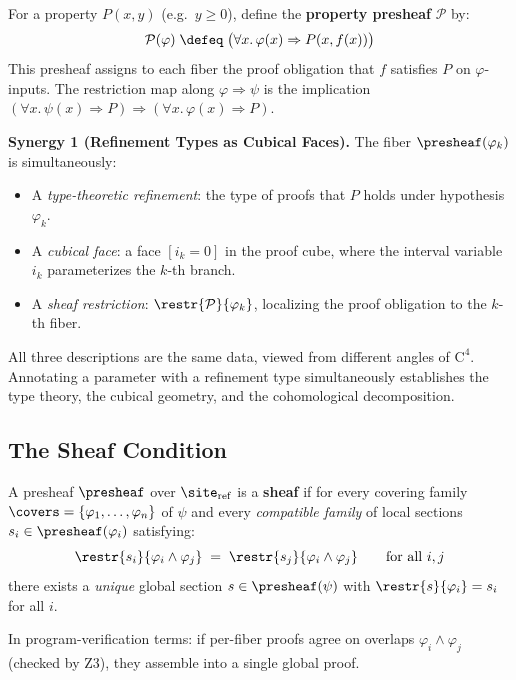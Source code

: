 \begin{example}
\label{ex:property-presheaf}
For a property $P(x, y)$ (e.g.\ $y \ge 0$), define the
\textbf{property presheaf} $\mathcal{P}$ by:
\[
  \mathcal{P}(\varphi) \;\defeq\;
  \bigl(\forall x.\,\varphi(x) \Rightarrow P(x, f(x))\bigr)
\]
This presheaf assigns to each fiber the proof obligation that $f$ satisfies
$P$ on $\varphi$-inputs.  The restriction map along $\varphi \Rightarrow
\psi$ is the implication $(\forall x.\,\psi(x) \Rightarrow P) \Rightarrow
(\forall x.\,\varphi(x) \Rightarrow P)$.

\medskip\noindent\textbf{Synergy 1 (Refinement Types as Cubical Faces).}
The fiber $\presheaf(\varphi_k)$ is simultaneously:
\begin{itemize}
\item A \emph{type-theoretic refinement}: the type of proofs that $P$
  holds under hypothesis $\varphi_k$.
\item A \emph{cubical face}: a face $[i_k = 0]$ in the proof cube, where
  the interval variable $i_k$ parameterizes the $k$-th branch.
\item A \emph{sheaf restriction}: $\restr{\mathcal{P}}{\varphi_k}$,
  localizing the proof obligation to the $k$-th fiber.
\end{itemize}
All three descriptions are the same data, viewed from different angles of
$\mathrm{C}^4$.  Annotating a parameter with a refinement type
simultaneously establishes the type theory, the cubical geometry, and the
cohomological decomposition.
\end{example}

\subsection{The Sheaf Condition}

\begin{definition}
\label{def:refinement-sheaf-condition}
A presheaf $\presheaf$ over $\site_{\mathrm{ref}}$ is a \textbf{sheaf} if
for every covering family $\covers = \{\varphi_1,\ldots,\varphi_n\}$ of
$\psi$ and every \emph{compatible family} of local sections
$s_i \in \presheaf(\varphi_i)$ satisfying:
\[
  \restr{s_i}{\varphi_i \wedge \varphi_j} \;=\;
  \restr{s_j}{\varphi_i \wedge \varphi_j}
  \qquad \text{for all } i, j
\]
there exists a \emph{unique} global section $s \in \presheaf(\psi)$ with
$\restr{s}{\varphi_i} = s_i$ for all $i$.

In program-verification terms: if per-fiber proofs agree on overlaps
$\varphi_i \wedge \varphi_j$ (checked by Z3), they assemble into a single
global proof.
\end{definition}

